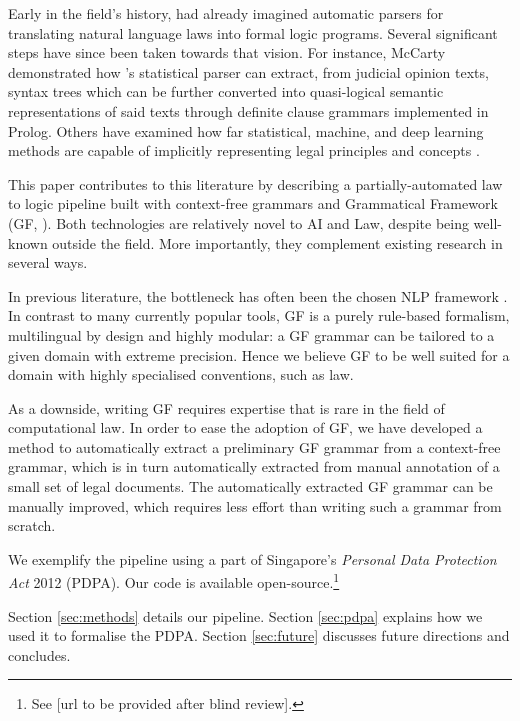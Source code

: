 \documentclass{IOS-Book-Article}
\begin{document}
Early in the field's history, \cite{bing_designing_1987} had already imagined automatic parsers for translating natural language laws into formal logic programs. Several significant steps have since been taken towards that vision. For instance, McCarty \cite{mccarty_deep_2007} demonstrated how \cite{collins_head-driven_2003}'s statistical parser can extract, from judicial opinion texts, syntax trees which can be further converted into quasi-logical semantic representations of said texts through definite clause grammars implemented in Prolog. Others have examined how far statistical, machine, and deep learning methods are capable of implicitly representing legal principles and concepts \cite{groendijk_neural_1992, de_maat_automatic_2008, winkels_automatic_2012, chalkidis_neural_2019, chalkidis_lexglue_2022}.

This paper contributes to this literature by describing a partially-automated law to logic pipeline built with
context-free grammars \cite{chomsky-1956} and Grammatical Framework (GF, \cite{ranta-2011}).
Both technologies are relatively novel to AI and Law, despite being well-known outside the field.
More importantly, they complement existing research in several ways.

In previous literature, the bottleneck has often been the chosen NLP framework \cite{quaresma_question_2005,wyner_study_2013}.
In contrast to many currently popular tools, GF is a purely rule-based formalism, multilingual by design and
highly modular: a GF grammar can be tailored to a given domain with extreme precision.
Hence we believe GF to be well suited for a domain with highly specialised conventions, such as law.

As a downside, writing GF requires expertise that is rare in the field of computational law.
In order to ease the adoption of GF, we have developed a method to automatically extract a preliminary GF grammar from a context-free grammar,
which is in turn automatically extracted from manual annotation of a small set of legal documents.
The automatically extracted GF grammar can be manually improved, which requires less effort than writing such a grammar from scratch.

We exemplify the pipeline using a part of Singapore's \textit{Personal Data Protection Act} 2012 (PDPA). Our code is available open-source.\footnote{See [url to be provided after blind review].}

Section \ref{sec:methods} details our pipeline. Section \ref{sec:pdpa} explains how we used it to formalise the PDPA. Section \ref{sec:future} discusses future directions and concludes.
\end{document}
